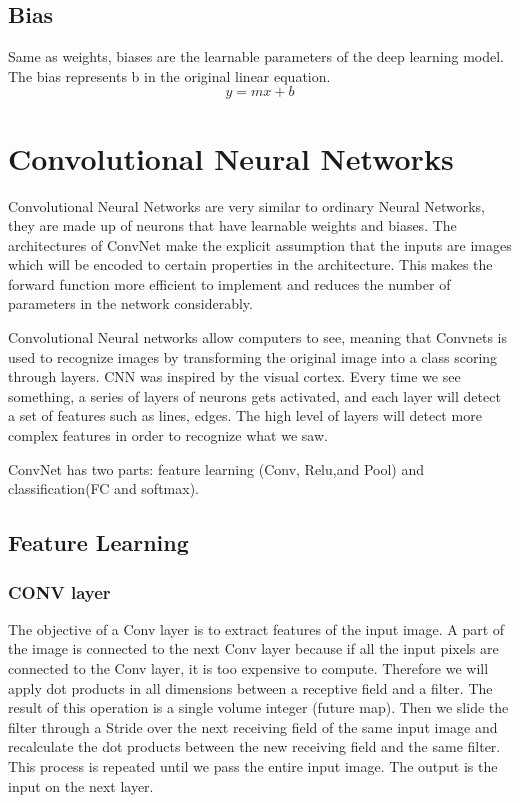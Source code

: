 \documentclass[12pt]{report}
\begin{document}
\subsection{Bias}
Same as weights, biases are the learnable parameters of the deep learning model.
The bias represents b in the original linear equation.
$$ y = mx + b $$

\section{Convolutional Neural Networks}
Convolutional Neural Networks are very similar to ordinary Neural Networks, 
they are made up of neurons that have learnable weights and biases.
The architectures of ConvNet make the explicit assumption that 
the inputs are images which will be encoded to certain properties in the architecture. 
This makes the forward function more efficient to implement and reduces the number of 
parameters in the network considerably.

Convolutional Neural networks allow computers to see, 
meaning that Convnets is used to recognize images by 
transforming the original image into a class scoring through layers.
CNN was inspired by the visual cortex.
Every time we see something, a series of layers of neurons gets activated, 
and each layer will detect a set of features such as lines, edges. 
The high level of layers will detect more complex features in order to recognize what we saw.

ConvNet has two parts: feature learning (Conv, Relu,and Pool) and classification(FC and softmax).

\subsection{Feature Learning}
\subsubsection{CONV layer}
    The objective of a Conv layer is to extract features of the input image.
    A part of the image is connected to the next Conv layer because if all the 
    input pixels are connected to the Conv layer, it is too expensive to compute. 
    Therefore we will apply dot products in all dimensions between a receptive 
    field and a filter. The result of this operation is a single volume integer (future map).
    Then we slide the filter through a Stride over the next receiving field of the same input 
    image and recalculate the dot products between the new receiving field and the same filter.
    This process is repeated until we pass the entire input image. The output is the input on the next layer.
\end{document}
